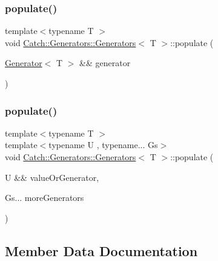 \subsubsection{\texorpdfstring{populate()}{populate()}\hspace{0.1cm}{\footnotesize\ttfamily [3/4]}}
{\footnotesize\ttfamily template$<$typename T $>$ \\
void \mbox{\hyperlink{struct_catch_1_1_generators_1_1_generators}{Catch\+::\+Generators\+::\+Generators}}$<$ T $>$\+::populate (\begin{DoxyParamCaption}\item[{\mbox{\hyperlink{class_catch_1_1_generators_1_1_generator}{Generator}}$<$ T $>$ \&\&}]{generator }\end{DoxyParamCaption})\hspace{0.3cm}{\ttfamily [inline]}}

\mbox{\label{struct_catch_1_1_generators_1_1_generators_a4b9680ee28e48e4dc4c4538b5510e649}} 
\subsubsection{\texorpdfstring{populate()}{populate()}\hspace{0.1cm}{\footnotesize\ttfamily [4/4]}}
{\footnotesize\ttfamily template$<$typename T $>$ \\
template$<$typename U , typename... Gs$>$ \\
void \mbox{\hyperlink{struct_catch_1_1_generators_1_1_generators}{Catch\+::\+Generators\+::\+Generators}}$<$ T $>$\+::populate (\begin{DoxyParamCaption}\item[{U \&\&}]{value\+Or\+Generator,  }\item[{Gs...}]{more\+Generators }\end{DoxyParamCaption})\hspace{0.3cm}{\ttfamily [inline]}}



\subsection{Member Data Documentation}
\mbox{\label{struct_catch_1_1_generators_1_1_generators_a49f1d0e8851a4726bb9981edffe094fa}} 
